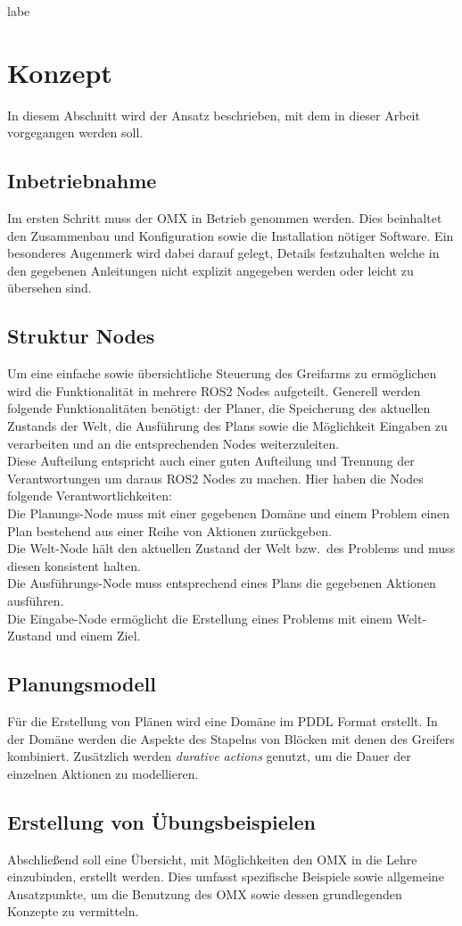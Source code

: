 labe\section{Konzept}{\label{konzept}}
In diesem Abschnitt wird der Ansatz beschrieben, mit dem in dieser Arbeit vorgegangen werden soll.
\subsection{Inbetriebnahme}
Im ersten Schritt muss der OMX in Betrieb genommen werden.
Dies beinhaltet den Zusammenbau und Konfiguration sowie die Installation nötiger Software.
Ein besonderes Augenmerk wird dabei darauf gelegt, Details festzuhalten welche in den gegebenen Anleitungen nicht explizit angegeben werden oder leicht zu übersehen sind.
\subsection{Struktur Nodes}{\label{konzept:nodes}}
Um eine einfache sowie übersichtliche Steuerung des Greifarms zu ermöglichen wird die Funktionalität in mehrere ROS2 Nodes aufgeteilt.
Generell werden folgende Funktionalitäten benötigt: der Planer, die Speicherung des aktuellen Zustands der Welt, die Ausführung des Plans sowie die Möglichkeit Eingaben zu verarbeiten und an die entsprechenden Nodes weiterzuleiten.\\
Diese Aufteilung entspricht auch einer guten Aufteilung und Trennung der Verantwortungen um daraus ROS2 Nodes zu machen.
Hier haben die Nodes folgende Verantwortlichkeiten:\\
Die Planungs-Node muss mit einer gegebenen Domäne und einem Problem einen Plan bestehend aus einer Reihe von Aktionen zurückgeben.\\
Die Welt-Node hält den aktuellen Zustand der Welt bzw.\ des Problems und muss diesen konsistent halten.\\
Die Ausführungs-Node muss entsprechend eines Plans die gegebenen Aktionen ausführen.\\
Die Eingabe-Node ermöglicht die Erstellung eines Problems mit einem Welt-Zustand und einem Ziel.
\subsection{Planungsmodell}{\label{konzept:planningmodel}}
Für die Erstellung von Plänen wird eine Domäne im \ac{PDDL} Format erstellt.
In der Domäne werden die Aspekte des Stapelns von Blöcken mit denen des Greifers kombiniert.
Zusätzlich werden \emph{durative actions} genutzt, um die Dauer der einzelnen Aktionen zu modellieren.
\subsection{Erstellung von Übungsbeispielen}{\label{konzept:exercise}}
Abschließend soll eine Übersicht, mit Möglichkeiten den OMX in die Lehre einzubinden,  erstellt werden.
Dies umfasst spezifische Beispiele sowie allgemeine Ansatzpunkte, um die Benutzung des OMX sowie dessen grundlegenden Konzepte zu vermitteln.
